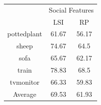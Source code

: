 \begin{table}[!ht]
 \begin{tabular}{|c|c|c|}
  \hline
{\multirow{2}{*}{Labels}} & \multicolumn{2}{|c|}{Social Features} \\ \cline{2-3}
 & LSI & RP \\ \hline
pottedplant & 61.67 & 56.17 \\  [1ex] \hline
sheep & 74.67 & 64.5 \\  [1ex] \hline
sofa & 65.67 & 62.17 \\  [1ex] \hline
train & 78.83 & 68.5 \\  [1ex] \hline
tvmonitor & 66.33 & 59.83 \\  [1ex] \hline
Average & 69.53 & 61.93 \\  [1ex] \hline
\end{tabular}
 \label{PASCALAccuracySocialFeatures} %
\end{table}

